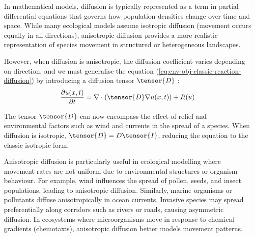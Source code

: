In mathematical models, diffusion is typically represented as a term in partial differential equations that governs how population densities change over time and space. While many ecological models assume isotropic diffusion (movement occurs equally in all directions), anisotropic diffusion provides a more realistic representation of species movement in structured or heterogeneous landscapes.

However, when diffusion is anisotropic, the diffusion coefficient varies depending on direction, and we must generalise the equation (\cref{eq:env-obj-classic-reaction-diffusion}) by introducing a diffusion tensor $\tensor{D}$ \cite{Ramos2024}:
\begin{align}
\label{eq:env-obj-reaction-diffusion}
\frac{\partial u (x, t)}{\partial t} = \nabla \cdot (\tensor{D} \nabla u(x, t)) + R(u)
\end{align}

The tensor $\tensor{D}$ can now encompass the effect of relief and environmental factors such as wind and currents in the spread of a species. When diffusion is isotropic, $\tensor{D} = D\tensor{I}$, reducing the equation to the classic isotropic form.

Anisotropic diffusion is particularly useful in ecological modelling where movement rates are not uniform due to environmental structures or organism behaviour. For example, wind influences the spread of pollen, seeds, and insect populations, leading to anisotropic diffusion. Similarly, marine organisms or pollutants diffuse anisotropically in ocean currents.
Invasive species may spread preferentially along corridors such as rivers or roads, causing asymmetric diffusion. In ecosystems where microorganisms move in response to chemical gradients (chemotaxis), anisotropic diffusion better models movement patterns.

